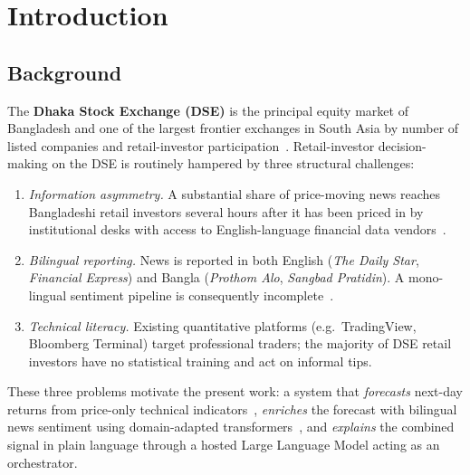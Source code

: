 \documentclass[12pt,a4paper,oneside]{report}
\begin{document}
\chapter{Introduction}
\label{ch:intro}

\section{Background}

The \textbf{Dhaka Stock Exchange (DSE)} is the principal equity
market of Bangladesh and one of the largest frontier exchanges in
South Asia by number of listed companies and retail-investor
participation~\cite{sezer2020financial,bailey2014stock}. Retail-investor
decision-making on the DSE is routinely hampered by three structural
challenges:

\begin{enumerate}[leftmargin=*,itemsep=2pt]
  \item \emph{Information asymmetry.} A substantial share of
        price-moving news reaches Bangladeshi retail investors
        several hours after it has been priced in by institutional
        desks with access to English-language financial data
        vendors~\cite{rapach2010forecasting}.
  \item \emph{Bilingual reporting.} News is reported in both English
        (\emph{The Daily Star}, \emph{Financial Express}) and Bangla
        (\emph{Prothom Alo}, \emph{Sangbad Pratidin}). A mono-lingual
        sentiment pipeline is consequently
        incomplete~\cite{lopez2023canchatgpt}.
  \item \emph{Technical literacy.} Existing quantitative platforms
        (e.g.\ TradingView, Bloomberg Terminal) target professional
        traders; the majority of DSE retail investors have no
        statistical training and act on informal tips.
\end{enumerate}

These three problems motivate the present work: a system that
\emph{forecasts} next-day returns from price-only technical
indicators~\cite{fischer2018deep}, \emph{enriches} the forecast with
bilingual news sentiment using domain-adapted transformers~\cite{araci2019finbert,yang2023fingpt},
and \emph{explains} the combined signal in plain language through a
hosted Large Language Model acting as an orchestrator.
\end{document}
